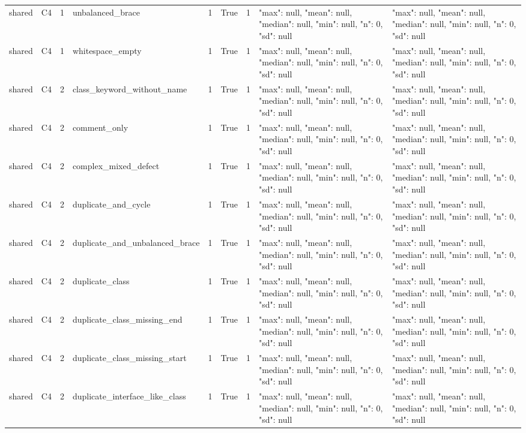 \begin{tabular}{lllllllll}
shared & C4 & 1 & unbalanced\_brace & 1 & True & 1 & {"max": null, "mean": null, "median": null, "min": null, "n": 0, "sd": null} & {"max": null, "mean": null, "median": null, "min": null, "n": 0, "sd": null} \\
shared & C4 & 1 & whitespace\_empty & 1 & True & 1 & {"max": null, "mean": null, "median": null, "min": null, "n": 0, "sd": null} & {"max": null, "mean": null, "median": null, "min": null, "n": 0, "sd": null} \\
shared & C4 & 2 & class\_keyword\_without\_name & 1 & True & 1 & {"max": null, "mean": null, "median": null, "min": null, "n": 0, "sd": null} & {"max": null, "mean": null, "median": null, "min": null, "n": 0, "sd": null} \\
shared & C4 & 2 & comment\_only & 1 & True & 1 & {"max": null, "mean": null, "median": null, "min": null, "n": 0, "sd": null} & {"max": null, "mean": null, "median": null, "min": null, "n": 0, "sd": null} \\
shared & C4 & 2 & complex\_mixed\_defect & 1 & True & 1 & {"max": null, "mean": null, "median": null, "min": null, "n": 0, "sd": null} & {"max": null, "mean": null, "median": null, "min": null, "n": 0, "sd": null} \\
shared & C4 & 2 & duplicate\_and\_cycle & 1 & True & 1 & {"max": null, "mean": null, "median": null, "min": null, "n": 0, "sd": null} & {"max": null, "mean": null, "median": null, "min": null, "n": 0, "sd": null} \\
shared & C4 & 2 & duplicate\_and\_unbalanced\_brace & 1 & True & 1 & {"max": null, "mean": null, "median": null, "min": null, "n": 0, "sd": null} & {"max": null, "mean": null, "median": null, "min": null, "n": 0, "sd": null} \\
shared & C4 & 2 & duplicate\_class & 1 & True & 1 & {"max": null, "mean": null, "median": null, "min": null, "n": 0, "sd": null} & {"max": null, "mean": null, "median": null, "min": null, "n": 0, "sd": null} \\
shared & C4 & 2 & duplicate\_class\_missing\_end & 1 & True & 1 & {"max": null, "mean": null, "median": null, "min": null, "n": 0, "sd": null} & {"max": null, "mean": null, "median": null, "min": null, "n": 0, "sd": null} \\
shared & C4 & 2 & duplicate\_class\_missing\_start & 1 & True & 1 & {"max": null, "mean": null, "median": null, "min": null, "n": 0, "sd": null} & {"max": null, "mean": null, "median": null, "min": null, "n": 0, "sd": null} \\
shared & C4 & 2 & duplicate\_interface\_like\_class & 1 & True & 1 & {"max": null, "mean": null, "median": null, "min": null, "n": 0, "sd": null} & {"max": null, "mean": null, "median": null, "min": null, "n": 0, "sd": null} \\

\end{tabular}
